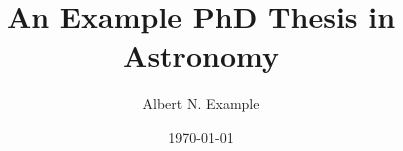 \documentclass[a4paper,12pt,oneside,openright]{report}
\begin{document}
\title{An Example PhD Thesis in Astronomy}
\author{Albert N. Example}
\date{\today}  %



\pagestyle{empty}



\pagestyle{plain}




\pagestyle{fancy}





\pagestyle{plain}


\pagestyle{fancy}
\appendix


\end{document}
